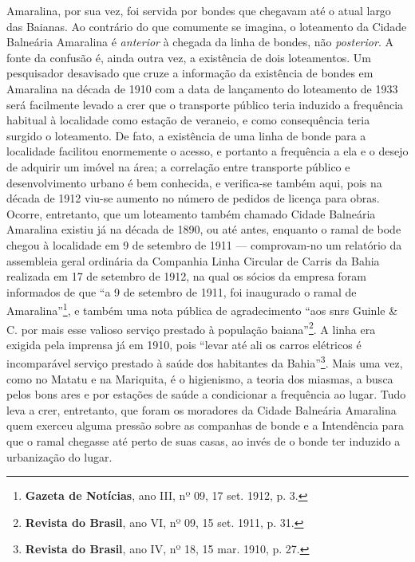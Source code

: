 
Amaralina, por sua vez, foi servida por bondes que chegavam até o atual largo das Baianas. Ao contrário do que comumente se imagina, o loteamento da Cidade Balneária Amaralina é \textit{anterior} à chegada da linha de bondes, não \textit{posterior}. A fonte da confusão é, ainda outra vez, a existência de dois loteamentos. Um pesquisador desavisado que cruze a informação da existência de bondes em Amaralina na década de 1910 com a data de lançamento do loteamento de 1933 será facilmente levado a crer que o transporte público teria induzido a frequência habitual à localidade como estação de veraneio, e como consequência teria surgido o loteamento. De fato, a existência de uma linha de bonde para a localidade facilitou enormemente o acesso, e portanto a frequência a ela e o desejo de adquirir um imóvel na área; a correlação entre transporte público e desenvolvimento urbano é bem conhecida, e verifica-se também aqui, pois na década de 1912 viu-se aumento no número de pedidos de licença para obras. Ocorre, entretanto, que um loteamento também chamado Cidade Balneária Amaralina existiu já na década de 1890, ou até antes, enquanto o ramal de bode chegou à localidade em 9 de setembro de 1911 --- comprovam-no um relatório da assembleia geral ordinária da Companhia Linha Circular de Carris da Bahia realizada em 17 de setembro de 1912, na qual os sócios da empresa foram informados de que ``a 9 de setembro de 1911, foi inaugurado o ramal de Amaralina''\footnote{\textbf{Gazeta de Notícias}, ano III, nº 09, 17 set. 1912, p. 3.}, e também uma nota pública de agradecimento ``aos snrs Guinle \& C. por mais esse valioso serviço prestado à população baiana''\footnote{\textbf{Revista do Brasil}, ano VI, nº 09, 15 set. 1911, p. 31.}. A linha era exigida pela imprensa já em 1910, pois ``levar até ali os carros elétricos é incomparável serviço prestado à saúde dos habitantes da Bahia''\footnote{\textbf{Revista do Brasil}, ano IV, nº 18, 15 mar. 1910, p. 27.}. Mais uma vez, como no Matatu e na Mariquita, é o higienismo, a teoria dos miasmas, a busca pelos bons ares e por estações de saúde a condicionar a frequência ao lugar. Tudo leva a crer, entretanto, que foram os moradores da Cidade Balneária Amaralina quem exerceu alguma pressão sobre as companhas de bonde e a Intendência para que o ramal chegasse até perto de suas casas, ao invés de o bonde ter induzido a urbanização do lugar.




